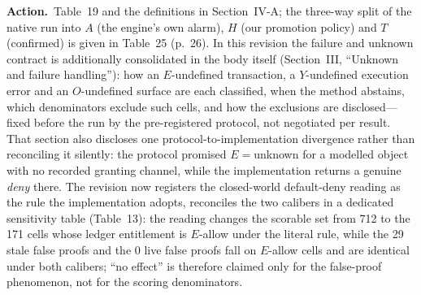 \documentclass[10pt,letterpaper]{article}
\newcommand{\Action}[1]{\par\smallskip\noindent\textbf{Action.}\ #1\par}
\begin{document}
\Action{Table~19 and the definitions in Section~IV-A; the three-way split of the
native run into $A$ (the engine's own alarm), $H$ (our promotion policy) and $T$
(confirmed) is given in Table~25 (p.~26). In this revision the failure and
unknown contract is additionally consolidated in the body itself
(Section~III, ``Unknown and failure handling''): how an $E$-undefined
transaction, a $Y$-undefined execution error and an $O$-undefined surface are
each classified, when the method abstains, which denominators exclude such
cells, and how the exclusions are disclosed---fixed before the run by the
pre-registered protocol, not negotiated per result. That section also discloses
one protocol-to-implementation divergence rather than reconciling it silently:
the protocol promised $E{=}$unknown for a modelled object with no recorded
granting channel, while the implementation returns a genuine \emph{deny} there.
The revision now registers the closed-world default-deny reading as the rule
the implementation adopts, reconciles the two calibers in a dedicated
sensitivity table (Table~13): the reading changes the scorable set from 712 to
the 171 cells whose ledger entitlement is $E$-allow under the literal rule,
while the 29 stale false proofs and the 0 live false proofs fall on
$E$-allow cells and are identical under both calibers; ``no effect'' is
therefore claimed only for the false-proof phenomenon, not for the scoring
denominators.}
\end{document}
